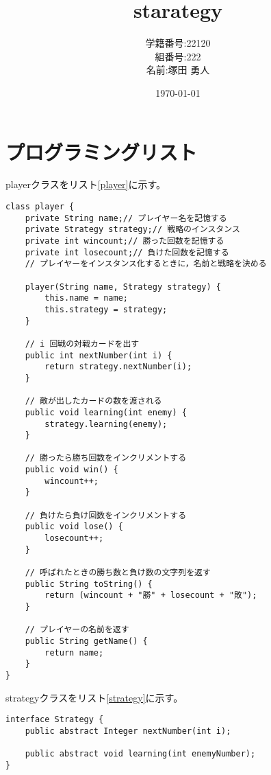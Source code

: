 \documentclass[a4paper,11pt,dvipdfmx]{jsarticle}
\begin{document}
\title{starategy}
\author{学籍番号:22120 \\ 組番号:222 \\名前:塚田 勇人}
\date{\today}
\maketitle

\newpage

\section{プログラミングリスト}
playerクラスをリスト\ref{player}に示す。
\begin{lstlisting}[caption=playerクラス,label=player]
  class player {
    private String name;// プレイヤー名を記憶する
    private Strategy strategy;// 戦略のインスタンス
    private int wincount;// 勝った回数を記憶する
    private int losecount;// 負けた回数を記憶する
    // プレイヤーをインスタンス化するときに，名前と戦略を決める

    player(String name, Strategy strategy) {
        this.name = name;
        this.strategy = strategy;
    }

    // i 回戦の対戦カードを出す
    public int nextNumber(int i) {
        return strategy.nextNumber(i);
    }

    // 敵が出したカードの数を渡される
    public void learning(int enemy) {
        strategy.learning(enemy);
    }

    // 勝ったら勝ち回数をインクリメントする
    public void win() {
        wincount++;
    }

    // 負けたら負け回数をインクリメントする
    public void lose() {
        losecount++;
    }

    // 呼ばれたときの勝ち数と負け数の文字列を返す
    public String toString() {
        return (wincount + "勝" + losecount + "敗");
    }

    // プレイヤーの名前を返す
    public String getName() {
        return name;
    }
}
\end{lstlisting}

strategyクラスをリスト\ref{strategy}に示す。

\begin{lstlisting}[caption=strategyクラス,label=strategy]
  interface Strategy {
    public abstract Integer nextNumber(int i);

    public abstract void learning(int enemyNumber);
}
\end{lstlisting}
\end{document}
